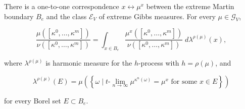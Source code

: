There is a one-to-one correspondence $x \leftrightarrow \mu^x$ between the extreme Martin boundary $B_e$ and the class $\mathcal{E}_V$ of extreme Gibbs measures. For every $\mu \in \mathcal{G}_V$,

$$
\frac{\mu([\kappa^0, \ldots, \kappa^m])}{\nu([\kappa^0, \ldots, \kappa^m])}
= \int_{x \in B_e} \frac{\mu^x([\kappa^0, \ldots, \kappa^m])}{\nu([\kappa^0, \ldots, \kappa^m])} \; d\lambda^{\rho(\mu)}(x),
$$

where $\lambda^{\rho(\mu)}$ is harmonic measure for the $h$-process with $h = \rho(\mu)$, and

$$
\lambda^{\rho(\mu)}(E) = \mu\left(\left\{ \omega \mid t\text{-}\lim_{n \to \infty} \mu^{\kappa^n(\omega)} = \mu^x \text{ for some } x \in E \right\}\right)
$$

for every Borel set $E \subset B_e$.
